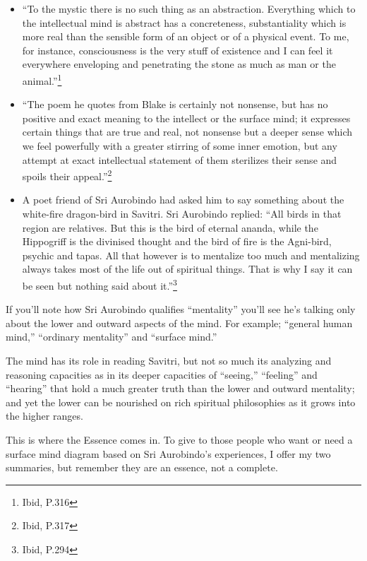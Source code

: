\documentclass[12pt,a4paper]{book}
\begin{document}
\begin{itemize}
\item ``To the mystic there is no such thing as an
  abstraction. Everything which to the intellectual mind is abstract
  has a concreteness, substantiality which is more real than the
  sensible form of an object or of a physical event. To me, for
  instance, consciousness is the very stuff of existence and I can
  feel it everywhere enveloping and penetrating the stone as much as
  man or the animal.''\footnote{Ibid, P.316}

\item ``The poem he quotes from Blake is certainly not nonsense, but
  has no positive and exact meaning to the intellect or the surface
  mind; it expresses certain things that are true and real, not
  nonsense but a deeper sense which we feel powerfully with a greater
  stirring of some inner emotion, but any attempt at exact
  intellectual statement of them sterilizes their sense and spoils
  their appeal.''\footnote{Ibid, P.317}

\item A poet friend of Sri Aurobindo had asked him to say something
  about the white-fire dragon-bird in Savitri. Sri Aurobindo replied:
  ``All birds in that region are relatives. But this is the bird of
  eternal ananda, while the Hippogriff is the divinised thought and
  the bird of fire is the Agni-bird, psychic and tapas. All that
  however is to mentalize too much and mentalizing always takes most
  of the life out of spiritual things. That is why I say it can be
  seen but nothing said about it.''\footnote{Ibid, P.294}
\end{itemize}

If you'll note how Sri Aurobindo qualifies ``mentality'' you'll see
he's talking only about the lower and outward aspects of the mind. For
example; ``general human mind,'' ``ordinary mentality'' and ``surface
mind.''

The mind has its role in reading Savitri, but not so much its
analyzing and reasoning capacities as in its deeper capacities of
``seeing,'' ``feeling'' and ``hearing'' that hold a much greater truth
than the lower and outward mentality; and yet the lower can be
nourished on rich spiritual philosophies as it grows into the higher
ranges.

This is where the Essence comes in. To give to those people who want
or need a surface mind diagram based on Sri Aurobindo's experiences, I
offer my two summaries, but remember they are an essence, not a
complete.


\newpage
\end{document}
